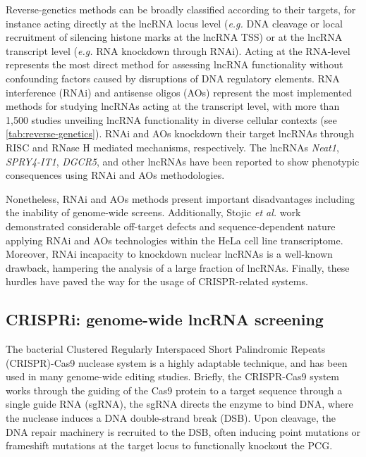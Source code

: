 Reverse-genetics methods can be broadly classified according to their targets, for instance acting directly at the lncRNA locus level (\textit{e.g.} DNA cleavage or local recruitment of silencing histone marks at the lncRNA TSS) or at the lncRNA transcript level (\textit{e.g.} RNA knockdown through RNAi).\autocite{gao_2020_reverse_genetics,morelli_2021_crispr} Acting at the RNA-level represents the most direct method for assessing lncRNA functionality without confounding factors caused by disruptions of DNA regulatory elements. RNA interference (RNAi) and antisense oligos (AOs) represent the most implemented methods for studying lncRNAs acting at the transcript level, with more than 1,500 studies unveiling lncRNA functionality in diverse cellular contexts\autocite{gao_2020_reverse_genetics} (see \autoref{tab:reverse-genetics}). RNAi and AOs knockdown their target lncRNAs through RISC and RNase H mediated mechanisms, respectively.\autocite{gao_2020_reverse_genetics,morelli_2021_crispr} The lncRNAs \textit{Neat1}, \textit{SPRY4-IT1}, \textit{DGCR5}, and other lncRNAs have been reported to show phenotypic consequences using RNAi and AOs methodologies.\autocite{clemson_2009_neat1,khaitan_2011_spry4-it1,meng_2018_dgcr5}

Nonetheless, RNAi and AOs methods present important disadvantages including the inability of genome-wide screens.\autocite{morelli_2021_crispr} Additionally, Stojic \textit{et al.} work demonstrated considerable off-target defects and sequence-dependent nature applying RNAi and AOs technologies within the HeLa cell line transcriptome.\autocite{stojic_2018_specificity} Moreover, RNAi incapacity to knockdown nuclear lncRNAs is a well-known drawback, hampering the analysis of a large fraction of lncRNAs.\autocite{stojic_2018_specificity,gao_2020_reverse_genetics,morelli_2021_crispr} Finally, these hurdles have paved the way for the usage of CRISPR-related systems.

\subsection{CRISPRi: genome-wide lncRNA screening}
\label{subsec:crispr-systems}

The bacterial Clustered Regularly Interspaced Short Palindromic Repeats (CRISPR)-Cas9 nuclease system is a highly adaptable technique, and has been used in many genome-wide editing studies.\autocite{cong_2013_crispr,mali_2013_crispr} Briefly, the CRISPR-Cas9 system works through the guiding of the Cas9 protein to a target sequence through a single guide RNA (sgRNA), the sgRNA directs the enzyme to bind DNA, where the nuclease induces a DNA double-strand break (DSB). Upon cleavage, the DNA repair machinery is recruited to the DSB, often inducing point mutations or frameshift mutations at the target locus to functionally knockout the PCG.\autocite{cong_2013_crispr,mali_2013_crispr}

